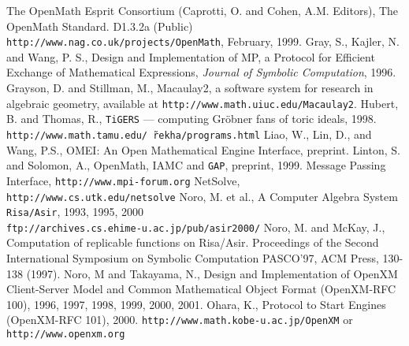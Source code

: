 
\begin{thebibliography}{X}
The OpenMath Esprit Consortium 
(Caprotti, O. and Cohen, A.M. Editors),
The OpenMath Standard. D1.3.2a (Public) \\
{\footnotesize \tt http://www.nag.co.uk/projects/OpenMath},
February, 1999.
Gray, S., Kajler, N. and Wang, P. S.,
Design and Implementation of MP, a Protocol for Efficient
  Exchange of Mathematical Expressions,
{\sl Journal of Symbolic Computation}, 1996.
Grayson, D. and Stillman, M.,
Macaulay2, a software system for research in algebraic geometry,
available at {\tt http://www.math.uiuc.edu/Macaulay2}.
Hubert, B. and Thomas, R.,
{\tt TiGERS} --- computing Gr\"obner fans of toric
ideals, 1998.
{\footnotesize
{\tt http://www.math.tamu.edu/\~\,rekha/programs.html}}
Liao, W., Lin, D., and Wang, P.S.,
{OMEI: An Open Mathematical Engine Interface},
preprint.
Linton, S. and Solomon, A.,
OpenMath, IAMC and {\tt GAP},
preprint, 1999.
 Message Passing Interface,
{\tt http://www.mpi-forum.org} 
NetSolve, {\tt http://www.cs.utk.edu/netsolve}
Noro, M. et al., 
A Computer Algebra System {\tt Risa/Asir},  1993, 1995, 2000\\
{\tt ftp://archives.cs.ehime-u.ac.jp/pub/asir2000/}
Noro, M. and McKay, J.,
Computation of replicable functions on Risa/Asir.
Proceedings of the Second International Symposium on
Symbolic Computation PASCO'97, ACM Press, 130-138 (1997).
Noro, M and Takayama, N., Design and Implementation
of OpenXM Client-Server Model and Common Mathematical Object Format
(OpenXM-RFC 100), 1996, 1997, 1998, 1999, 2000, 2001.
Ohara, K.,
Protocol to Start Engines (OpenXM-RFC 101),
2000.
{\footnotesize {\tt http://www.math.kobe-u.ac.jp/OpenXM}}
or 
{\footnotesize {\tt http://www.openxm.org}}

\end{thebibliography}
